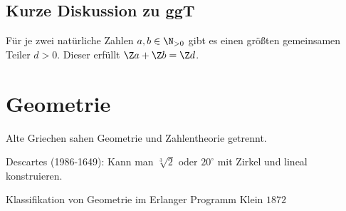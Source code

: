 \subsection{Kurze Diskussion zu ggT}
\begin{proposition}
	Für je zwei natürliche Zahlen $a,b \in \N_{>0}$ gibt es einen größten gemeinsamen Teiler $d > 0$.
	Dieser erfüllt $\Z a + \Z b = \Z d$.
\end{proposition}


\section{Geometrie}
Alte Griechen sahen Geometrie und Zahlentheorie getrennt.

Descartes (1986-1649): Kann man $\sqrt[3]{2}$ oder $20^{\circ}$ mit Zirkel und lineal konstruieren.

Klassifikation von Geometrie im Erlanger Programm Klein $1872$














